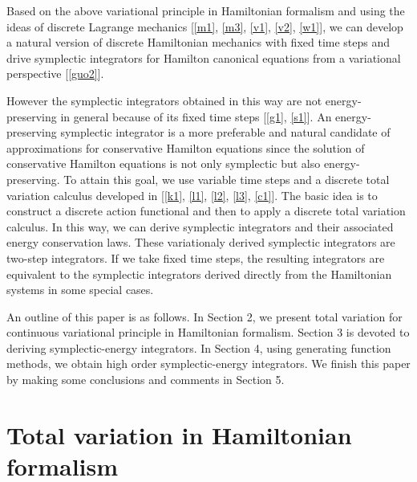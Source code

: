 \documentclass[a4paper,a4paper]{article}
\def\sect#1{\section{#1}\setcounter{equation}{0}}
\begin{document}
Based on the above variational principle in Hamiltonian formalism and using
the ideas of discrete Lagrange mechanics
[\ref{m1}, \ref{m3}, \ref{v1}, \ref{v2}, \ref{w1}],
we can develop a natural version
of discrete Hamiltonian mechanics with fixed time steps and drive symplectic
integrators for Hamilton canonical equations from a variational perspective
[\ref{guo2}].

 However the symplectic integrators
obtained in this way are not energy-preserving in general because of its fixed
time steps [\ref{g1}, \ref{s1}].
 An energy-preserving symplectic  integrator
is a more preferable and natural candidate of approximations for
conservative Hamilton equations  since the solution of
conservative Hamilton equations is not only symplectic but also
energy-preserving. To attain this goal, we use variable time steps
and a discrete total variation calculus developed in [\ref{k1},
\ref{l1}, \ref{l2}, \ref{l3}, \ref{c1}]. The basic idea is to
construct a discrete action functional and then to apply a
discrete total variation calculus. In this way, we can derive
symplectic integrators and their associated energy conservation
laws. These variationaly derived symplectic integrators are
two-step integrators. If we take fixed time steps, the resulting
integrators are equivalent to the symplectic integrators derived
directly from the Hamiltonian systems in some special cases.

An outline of this paper is as follows. In Section 2, we
present total variation for continuous variational principle in Hamiltonian
formalism.  Section 3 is devoted to deriving symplectic-energy integrators.
In Section 4, using generating function methods, we obtain high order
symplectic-energy integrators.
 We finish this paper by making some conclusions and comments in Section 5.



\sect{Total variation in Hamiltonian formalism }
\end{document}
